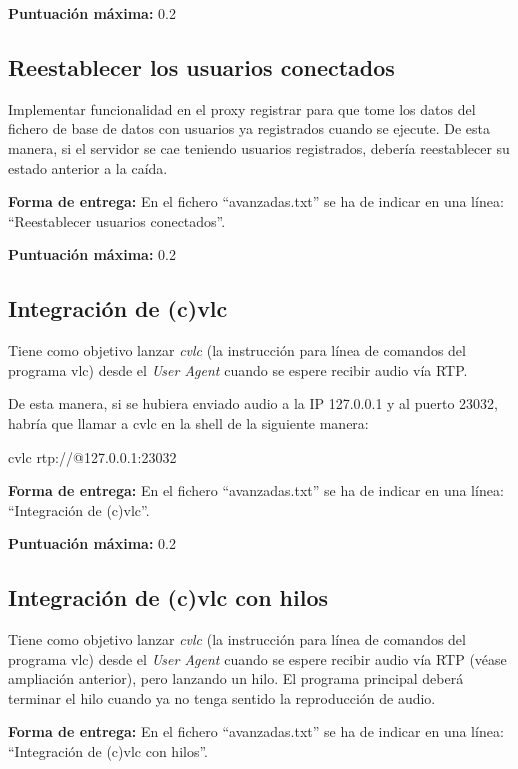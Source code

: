 \documentclass[a4paper,11pt]{article}
\begin{document}
  {\bf Puntuación máxima:} 0.2

\subsection*{Reestablecer los usuarios conectados}

Implementar funcionalidad en el proxy registrar para que tome los datos del fichero de base de datos con usuarios ya registrados cuando se ejecute. De esta manera, si el servidor se cae teniendo usuarios registrados, debería reestablecer su estado anterior a la caída. 


  {\bf Forma de entrega:} En el fichero ``avanzadas.txt'' se ha de indicar en una línea: ``Reestablecer usuarios conectados''.

  {\bf Puntuación máxima:} 0.2


\subsection*{Integración de (c)vlc}


Tiene como objetivo lanzar \emph{cvlc} (la instrucción para línea de comandos del programa vlc) desde el \emph{User Agent} cuando se espere recibir audio vía RTP.

De esta manera, si se hubiera enviado audio a la IP 127.0.0.1 y al puerto 23032, habría que llamar a cvlc en la shell de la siguiente manera:

cvlc rtp://@127.0.0.1:23032

  {\bf Forma de entrega:} En el fichero ``avanzadas.txt'' se ha de indicar en una línea: ``Integración de (c)vlc''.

  {\bf Puntuación máxima:} 0.2

\subsection*{Integración de (c)vlc con hilos}

Tiene como objetivo lanzar \emph{cvlc} (la instrucción para línea de comandos del programa vlc) desde el \emph{User Agent} cuando se espere recibir audio vía RTP (véase ampliación anterior), pero lanzando un hilo. El programa principal deberá terminar el hilo cuando ya no tenga sentido la reproducción de audio.

  {\bf Forma de entrega:} En el fichero ``avanzadas.txt'' se ha de indicar en una línea: ``Integración de (c)vlc con hilos''.
\end{document}
